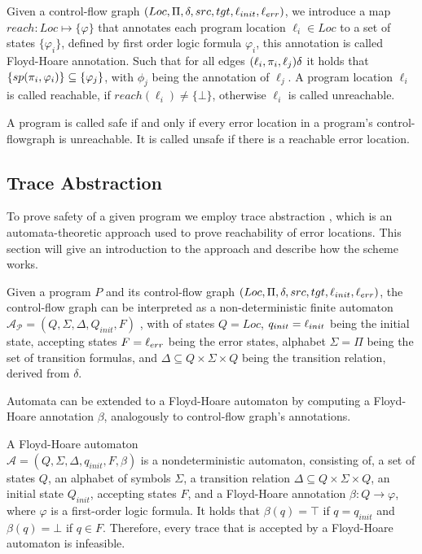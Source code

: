 \begin{mydef}
	Given a control-flow graph $(Loc, \Pi, \delta, src, tgt, \ell_{init}, \ell_{err})$, we introduce a map $reach: Loc \mapsto \{\varphi\}$ that annotates each program location $\ell_i \in Loc$ to a set of states $\{\varphi_i\}$, defined by first order logic formula $\varphi_i$, this annotation is called Floyd-Hoare annotation. Such that for all edges $(\ell_i, \pi_i, \ell_j) \delta$ it holds that $\{sp(\pi_i, \varphi_i)\} \subseteq \{\varphi_j\}$, with $\phi_j$ being the annotation of $\ell_j$.
	 A program location $\ell_i$ is called reachable, if $reach(\ell_i) \neq \{\bot\}$, otherwise $\ell_i$ is called unreachable.
\end{mydef}
A program is called safe if and only if every error location in a program's control-flowgraph is unreachable. It is called unsafe if there is a reachable error location.

\subsection{Trace Abstraction}
To prove safety of a given program we employ trace abstraction \cite{10.1007/978-3-642-03237-0_7, 10.1007/978-3-642-39799-8_2, 10.1145/1706299.1706353}, which is an automata-theoretic approach used to prove reachability of error locations. This section will give an introduction to the approach and describe how the scheme works. \\ \par

Given a program $P$ and its control-flow graph $(Loc, \Pi, \delta, src, tgt, \ell_{init}, \ell_{err})$, the control-flow graph can be interpreted as a non-deterministic finite automaton \\ $\mathcal{A_P} = (Q, \Sigma, \Delta, Q_{init}, F)$ , with of states $Q = Loc$, $q_{init} = \ell_{init}$ being the initial state, accepting states $F = \ell_{err}$ being the error states, alphabet $\Sigma = \Pi$ being the set of transition formulas, and $\Delta \subseteq Q \times \Sigma \times Q$ being the transition relation, derived from $\delta$. \\ \par 
Automata can be extended to a Floyd-Hoare automaton by computing a Floyd-Hoare annotation $\beta$, analogously to control-flow graph's annotations.
\begin{mydef}
	A Floyd-Hoare automaton \\$\mathcal{A} = (Q, \Sigma, \Delta, q_{init}, F, \beta)$ is a nondeterministic automaton, consisting of, a set of states $Q$, an alphabet of symbols $\Sigma$, a transition relation $\Delta \subseteq Q \times \Sigma \times Q$, an initial state $Q_{init}$, accepting states $F$, and a Floyd-Hoare annotation $\beta: Q \rightarrow \varphi$, where $\varphi$ is a first-order logic formula. It holds that $\beta(q) = \top$ if $q = q_{init}$ and $\beta(q) = \bot$ if $q \in F$. Therefore, every trace that is accepted by a Floyd-Hoare automaton is infeasible.
\end{mydef}

